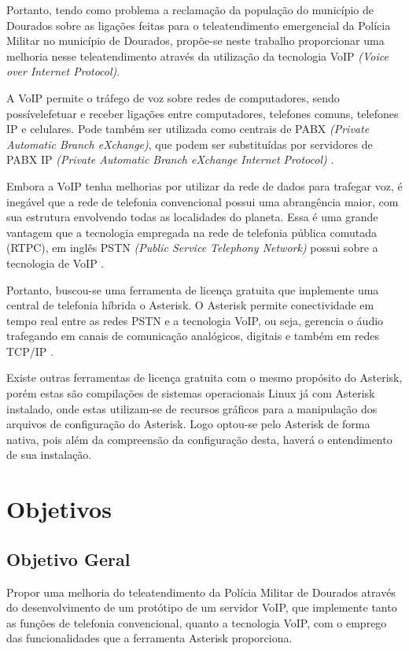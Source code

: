 Portanto, tendo como problema a reclamação da população do município de Dourados sobre as ligações feitas para o teleatendimento emergencial da Polícia Militar no município de Dourados, propõe-se neste trabalho proporcionar uma melhoria nesse teleatendimento através da utilização da tecnologia VoIP \textit{(Voice over Internet Protocol)}. 

A VoIP permite o tráfego de voz sobre redes de computadores, sendo possívelefetuar e receber ligações entre computadores, telefones comuns, telefones IP e celulares. Pode também ser utilizada como centrais de PABX \textit{(Private Automatic Branch eXchange)}, que podem ser substituídas por servidores de PABX IP \textit{(Private Automatic Branch eXchange Internet Protocol)} \cite{glauciadasilvaribeiro2011}.

Embora a VoIP tenha melhorias por utilizar da rede de dados para trafegar voz, é inegável que a rede de telefonia convencional possui uma abrangência maior, com sua estrutura envolvendo todas as localidades do planeta. Essa é uma grande vantagem que a tecnologia empregada na rede de telefonia pública comutada (RTPC), em inglês PSTN \textit{(Public Service Telephony Network)} possui sobre a tecnologia de VoIP \cite{theodorewallingford2005}.

Portanto, buscou-se uma ferramenta de licença gratuita que implemente uma central de telefonia híbrida o Asterisk. O Asterisk  permite conectividade em tempo real entre as redes PSTN e a tecnologia VoIP, ou seja, gerencia o áudio trafegando em canais de comunicação analógicos, digitais e também em redes TCP/IP \cite{alexandrekeller2014}.

Existe outras ferramentas de licença gratuita com o mesmo propósito do Asterisk, porém estas são compilações de sistemas operacionais Linux já com Asterisk instalado, onde estas utilizam-se de recursos gráficos para a manipulação dos arquivos de configuração do Asterisk. Logo optou-se pelo Asterisk de forma nativa, pois além da compreensão da configuração desta, haverá o entendimento de sua instalação.

\section{Objetivos}
\subsection{Objetivo Geral}
Propor uma melhoria do teleatendimento da Polícia Militar de Dourados através do desenvolvimento de um protótipo de um servidor VoIP, que implemente tanto as funções de telefonia convencional, quanto a tecnologia VoIP, com o emprego das funcionalidades que a ferramenta Asterisk proporciona.


